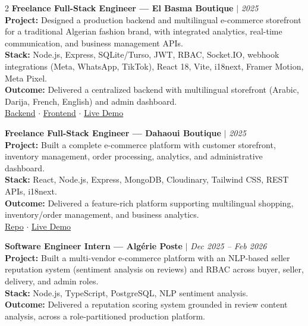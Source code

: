 \documentclass[8pt, letterpaper]{extarticle}
\begin{document}
\begin{multicols}{2}
\textbf{Freelance Full-Stack Engineer — El Basma Boutique} \textcolor{rulecolor}{$|$} \textit{2025} \\
\textbf{Project:} Designed a production backend and multilingual e-commerce storefront for a traditional Algerian fashion brand, with integrated analytics, real-time communication, and business management APIs. \\
\textbf{Stack:} Node.js, Express, SQLite/Turso, JWT, RBAC, Socket.IO, webhook integrations (Meta, WhatsApp, TikTok), React 18, Vite, i18next, Framer Motion, Meta Pixel. \\
\textbf{Outcome:} Delivered a centralized backend with multilingual storefront (Arabic, Darija, French, English) and admin dashboard. \\
{\small {}\;\href{https://github.com/Samir-Guenchi/el-basma-backend}{Backend} \;\textcolor{rulecolor}{$\cdot$}\; \href{https://github.com/Samir-Guenchi/el-basma-website-front-end}{Frontend} \;\textcolor{rulecolor}{$\cdot$}\; \;\href{https://el-basma-website-front-end.vercel.app/}{Live Demo}} \vspace{3pt}

\textbf{Freelance Full-Stack Engineer — Dahaoui Boutique} \textcolor{rulecolor}{$|$} \textit{2025} \\
\textbf{Project:} Built a complete e-commerce platform with customer storefront, inventory management, order processing, analytics, and administrative dashboard. \\
\textbf{Stack:} React, Node.js, Express, MongoDB, Cloudinary, Tailwind CSS, REST APIs, i18next. \\
\textbf{Outcome:} Delivered a feature-rich platform supporting multilingual shopping, inventory/order management, and business analytics. \\
{\small {}\;\href{https://github.com/Samir-Guenchi/dahaoui_boutique}{Repo} \;\textcolor{rulecolor}{$\cdot$}\; \;\href{https://dahaoui-boutiquee.vercel.app/}{Live Demo}} \vspace{3pt}

\textbf{Software Engineer Intern — Algérie Poste} \textcolor{rulecolor}{$|$} \textit{Dec 2025 – Feb 2026} \\
\textbf{Project:} Built a multi-vendor e-commerce platform with an NLP-based seller reputation system (sentiment analysis on reviews) and RBAC across buyer, seller, delivery, and admin roles. \\
\textbf{Stack:} Node.js, TypeScript, PostgreSQL, NLP sentiment analysis. \\
\textbf{Outcome:} Delivered a reputation scoring system grounded in review content analysis, across a role-partitioned production platform. \vspace{3pt}


\end{multicols}
\end{document}
